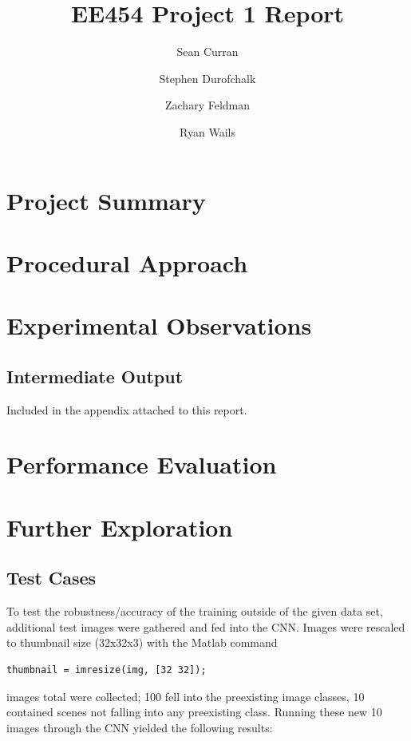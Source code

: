 \documentclass[11pt,english]{article}
\author{Sean Curran \\
\and Stephen Durofchalk \\
\and Zachary Feldman \\
\and Ryan Wails}
\title{EE454 Project 1 Report}
\begin{document}
\maketitle

\newpage
\section{Project Summary}

\section{Procedural Approach}

\section{Experimental Observations}

\subsection{Intermediate Output}

Included in the appendix attached to this report.

\section{Performance Evaluation}


\section{Further Exploration}
\subsection{Test Cases}
To test the robustness/accuracy of the training outside of the given data set, additional test images were gathered and fed into the CNN.  Images were rescaled to thumbnail size (32x32x3) with the Matlab command
\begin{lstlisting}
thumbnail = imresize(img, [32 32]);
\end{lstlisting}

 images total were collected; 100 fell into the preexisting image classes, 10 contained scenes not falling into any preexisting class.  Running these new 10 images through the CNN yielded the following results:\\
\end{document}

